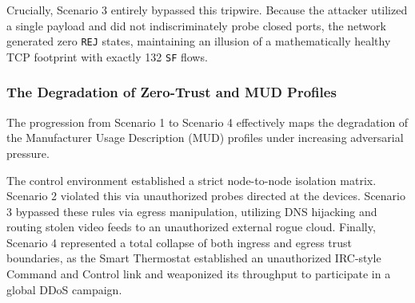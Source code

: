 Crucially, Scenario 3 entirely bypassed this tripwire. Because the attacker utilized a single payload and did not indiscriminately probe closed ports, the network generated zero \texttt{REJ} states, maintaining an illusion of a mathematically healthy TCP footprint with exactly 132 \texttt{SF} flows.

\subsubsection{The Degradation of Zero-Trust and MUD Profiles}

The progression from Scenario 1 to Scenario 4 effectively maps the degradation of the Manufacturer Usage Description (MUD) profiles under increasing adversarial pressure. 

The control environment established a strict node-to-node isolation matrix. Scenario 2 violated this via unauthorized probes directed at the devices. Scenario 3 bypassed these rules via egress manipulation, utilizing DNS hijacking and routing stolen video feeds to an unauthorized external rogue cloud. Finally, Scenario 4 represented a total collapse of both ingress and egress trust boundaries, as the Smart Thermostat established an unauthorized IRC-style Command and Control link and weaponized its throughput to participate in a global DDoS campaign.